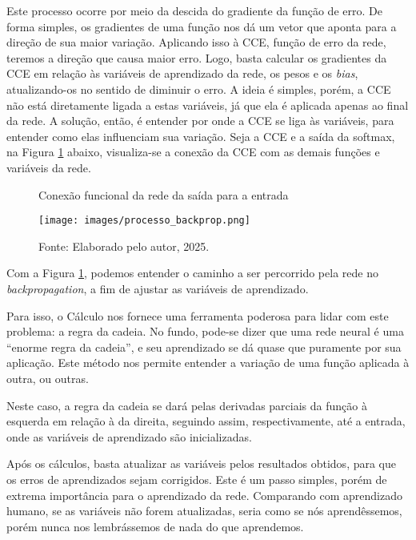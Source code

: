 \documentclass[12pt]{article}
\begin{document}
Este processo ocorre por meio da descida do gradiente da função de erro. De forma simples, os gradientes de uma função nos dá um vetor que aponta para a direção de sua maior variação. Aplicando isso à CCE, função de erro da rede, teremos a direção que causa maior erro. Logo, basta calcular os gradientes da CCE em relação às variáveis de aprendizado da rede, os pesos e os \textit{bias}, atualizando-os no sentido de diminuir o erro.
A ideia é simples, porém, a CCE não está diretamente ligada a estas variáveis, já que ela é aplicada apenas ao final da rede. A solução, então, é entender por onde a CCE se liga às variáveis, para entender como elas influenciam sua variação.
Seja a CCE e  a saída da softmax, na Figura \ref{fig:backprop} abaixo, visualiza-se a conexão da CCE com as demais funções e variáveis da rede.


\begin{figure}[H]
    \centering
    \caption{\fontsize{10}{12}\selectfont Conexão funcional da rede da saída para a entrada}
    \texttt{[image: images/processo\_backprop.png]}
    \caption*{\fontsize{10}{12}\selectfont Fonte: Elaborado pelo autor, 2025.}
    \label{fig:backprop}
\end{figure}

Com a Figura \ref{fig:backprop}, podemos entender o caminho a ser percorrido pela rede no \textit{backpropagation}, a fim de ajustar as variáveis de aprendizado.

Para isso, o Cálculo nos fornece uma ferramenta poderosa para lidar com este problema: a regra da cadeia. No fundo, pode-se dizer que uma rede neural é uma “enorme regra da cadeia”, e seu aprendizado se dá quase que puramente por sua aplicação. Este método nos permite entender a variação de uma função aplicada à outra, ou outras.

Neste caso, a regra da cadeia se dará pelas derivadas parciais da função à esquerda em relação à da direita, seguindo assim, respectivamente, até a entrada, onde as variáveis de aprendizado são inicializadas.

Após os cálculos, basta atualizar as variáveis pelos resultados obtidos, para que os erros de aprendizados sejam corrigidos. Este é um passo simples, porém de extrema importância para o aprendizado da rede. Comparando com aprendizado humano, se as variáveis não forem atualizadas, seria como se nós aprendêssemos, porém nunca nos lembrássemos de nada do que aprendemos.
\end{document}
